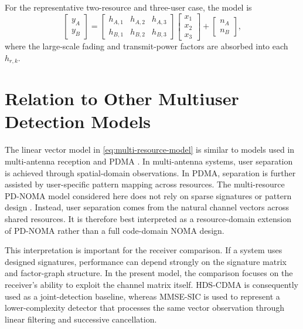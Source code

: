 For the representative two-resource and three-user case, the model is
\begin{equation}
    \begin{bmatrix}y_A\\y_B\end{bmatrix}
    =
    \begin{bmatrix}
    h_{A,1} & h_{A,2} & h_{A,3}\\
    h_{B,1} & h_{B,2} & h_{B,3}
    \end{bmatrix}
    \begin{bmatrix}x_1\\x_2\\x_3\end{bmatrix}
    +
    \begin{bmatrix}n_A\\n_B\end{bmatrix},
\end{equation}
where the large-scale fading and transmit-power factors are absorbed into each $h_{r,k}$.


\section{Relation to Other Multiuser Detection Models}

The linear vector model in \eqref{eq:multi-resource-model} is similar to models used in multi-antenna reception and PDMA \cite{endo2012mmse,li2013mimo,kong2016pdma}. In multi-antenna systems, user separation is achieved through spatial-domain observations. In PDMA, separation is further assisted by user-specific pattern mapping across resources. The multi-resource PD-NOMA model considered here does not rely on sparse signatures or pattern design \cite{mohammadkarimi2018snoma}. Instead, user separation comes from the natural channel vectors across shared resources. It is therefore best interpreted as a resource-domain extension of PD-NOMA rather than a full code-domain NOMA design.

This interpretation is important for the receiver comparison. If a system uses designed signatures, performance can depend strongly on the signature matrix and factor-graph structure. In the present model, the comparison focuses on the receiver's ability to exploit the channel matrix itself. HDS-CDMA is consequently used as a joint-detection baseline, whereas MMSE-SIC is used to represent a lower-complexity detector that processes the same vector observation through linear filtering and successive cancellation.

